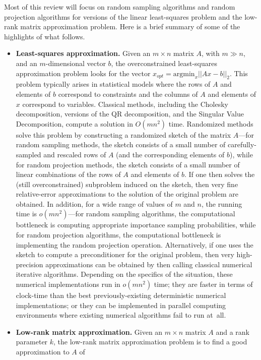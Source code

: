\documentclass[twoside]{article}
\begin{document}
Most of this review will focus on random sampling algorithms and random 
projection algorithms for versions of the linear least-squares problem and 
the low-rank matrix approximation problem.
Here is a brief summary of some of the highlights of what follows.
\begin{itemize}
\item
\textbf{Least-squares approximation.}
Given an $m \times n$ matrix $A$, with $m \gg n$, and an $m$-dimensional 
vector $b$, the overconstrained least-squares approximation problem looks 
for the vector $x_{opt} = \mbox{argmin}_x ||Ax-b||_2  $.
This problem typically arises in statistical models where the rows of $A$ 
and elements of $b$ correspond to constraints and the columns of $A$ and 
elements of $x$ correspond to variables.
Classical methods, including the Cholesky decomposition, versions of the QR 
decomposition, and the Singular Value Decomposition, compute a solution
in $O(mn^2)$ time.
Randomized methods solve this problem by constructing a randomized sketch 
of the matrix $A$---for random sampling methods, the sketch consists of a 
small number of carefully-sampled and rescaled rows of $A$ (and the 
corresponding elements of $b$), while for random projection methods, the 
sketch consists of a small number of linear combinations of the rows of $A$ and elements of $b$.
If one then solves the (still overconstrained) subproblem induced on the 
sketch, then very fine relative-error approximations to the solution of the 
original problem are obtained.
In addition, for a wide range of values of $m$ and $n$, the running time is 
$o(mn^2)$---for random sampling algorithms, the computational bottleneck is 
computing appropriate importance sampling probabilities, while for random 
projection algorithms, the computational bottleneck is implementing the 
random projection operation.
Alternatively, if one uses the sketch to compute a preconditioner for the
original problem, then very high-precision approximations can be obtained by
then calling classical numerical iterative algorithms.
Depending on the specifics of the situation, these numerical implementations 
run in $o(mn^2)$ time; they are faster in terms of clock-time than the best 
previously-existing deterministic numerical implementations; or they can be implemented in 
parallel computing environments where existing numerical algorithms fail to 
run at~all.
\item
\textbf{Low-rank matrix approximation.}
Given an $m \times n$ matrix $A$ and a rank parameter $k$, the low-rank 
matrix approximation problem is to find a good approximation to $A$ of 

\end{itemize}
\end{document}
